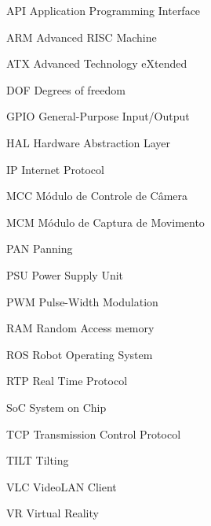 
\begin{siglas}
	\item[API]         Application Programming Interface
	\item[ARM]         Advanced RISC Machine
	\item[ATX]         Advanced Technology eXtended
	\item[DOF]         Degrees of freedom
	\item[GPIO]        General-Purpose Input/Output
	\item[HAL]         Hardware Abstraction Layer
	\item[IP]          Internet Protocol
	\item[MCC]         Módulo de Controle de Câmera
	\item[MCM]         Módulo de Captura de Movimento
	\item[PAN]         Panning
	\item[PSU]         Power Supply Unit
	\item[PWM]         Pulse-Width Modulation
	\item[RAM]         Random Access memory
	\item[ROS]		   Robot Operating System
	\item[RTP]         Real Time Protocol
	\item[SoC]         System on Chip
	\item[TCP]         Transmission Control Protocol
	\item[TILT]        Tilting
	\item[VLC]         VideoLAN Client
	\item[VR]          Virtual Reality
\end{siglas}

